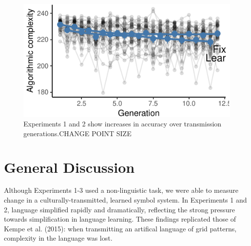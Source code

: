 \documentclass[10pt, letterpaper]{article}
\newenvironment{CodeChunk}{}{}
\begin{document}
\begin{CodeChunk}
\begin{figure}[tb]

{\centering \includegraphics{figs/e3_bdm_plot-1} 

}

\caption[Experiments 1 and 2 show increases in accuracy over transmission generations.CHANGE POINT SIZE]{Experiments 1 and 2 show increases in accuracy over transmission generations.CHANGE POINT SIZE}\label{fig:e3_bdm_plot}
\end{figure}
\end{CodeChunk}

\section{General Discussion}\label{general-discussion}

Although Experiments 1-3 used a non-linguistic task, we were able to
measure change in a culturally-transmitted, learned symbol system. In
Experiments 1 and 2, language simplified rapidly and dramatically,
reflecting the strong pressure towards simplification in language
learning. These findings replicated those of Kempe et al. (2015): when
transmitting an artifical language of grid patterns, complexity in the
language was lost.
\end{document}
